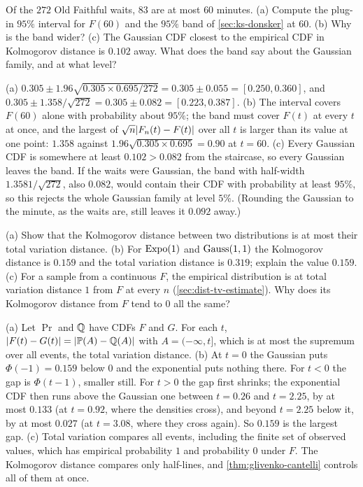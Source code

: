 \begin{exercise}
\label{ex:ks-band}
Of the $272$ Old Faithful waits, $83$ are at most $60$ minutes. (a) Compute the plug-in $95\%$ interval for $F(60)$ and the $95\%$ band of \cref{sec:ks-donsker} at $60$. (b) Why is the band wider? (c) The Gaussian CDF closest to the empirical CDF in Kolmogorov distance is $0.102$ away. What does the band say about the Gaussian family, and at what level?
\end{exercise}
\begin{solution}
(a) $0.305 \pm 1.96\sqrt{0.305 \times 0.695/272} = 0.305 \pm 0.055 = [0.250, 0.360]$, and $0.305 \pm 1.358/\sqrt{272} = 0.305 \pm 0.082 = [0.223, 0.387]$. (b) The interval covers $F(60)$ alone with probability about $95\%$; the band must cover $F(t)$ at every $t$ at once, and the largest of $\sqrt{n}\lvert F_n(t) - F(t)\rvert$ over all $t$ is larger than its value at one point: $1.358$ against $1.96\sqrt{0.305 \times 0.695} = 0.90$ at $t = 60$. (c) Every Gaussian CDF is somewhere at least $0.102 > 0.082$ from the staircase, so every Gaussian leaves the band. If the waits were Gaussian, the band with half-width $1.3581/\sqrt{272}$, also $0.082$, would contain their CDF with probability at least $95\%$, so this rejects the whole Gaussian family at level $5\%$. (Rounding the Gaussian to the minute, as the waits are, still leaves it $0.092$ away.)
\end{solution}

\begin{exercise}
\label{ex:ks-tv}
(a) Show that the Kolmogorov distance between two distributions is at most their total variation distance. (b) For $\text{Expo}(1)$ and $\text{Gauss}(1, 1)$ the Kolmogorov distance is $0.159$ and the total variation distance is $0.319$; explain the value $0.159$. (c) For a sample from a continuous $F$, the empirical distribution is at total variation distance $1$ from $F$ at every $n$ (\cref{sec:dist-tv-estimate}). Why does its Kolmogorov distance from $F$ tend to $0$ all the same?
\end{exercise}
\begin{solution}
(a) Let $\Pr$ and $\mathbb{Q}$ have CDFs $F$ and $G$. For each $t$, $\lvert F(t) - G(t)\rvert = \lvert\mathbb{P}(A) - \mathbb{Q}(A)\rvert$ with $A = (-\infty, t]$, which is at most the supremum over all events, the total variation distance. (b) At $t = 0$ the Gaussian puts $\Phi(-1) = 0.159$ below $0$ and the exponential puts nothing there. For $t < 0$ the gap is $\Phi(t - 1)$, smaller still. For $t > 0$ the gap first shrinks; the exponential CDF then runs above the Gaussian one between $t = 0.26$ and $t = 2.25$, by at most $0.133$ (at $t = 0.92$, where the densities cross), and beyond $t = 2.25$ below it, by at most $0.027$ (at $t = 3.08$, where they cross again). So $0.159$ is the largest gap. (c) Total variation compares all events, including the finite set of observed values, which has empirical probability $1$ and probability $0$ under $F$. The Kolmogorov distance compares only half-lines, and \cref{thm:glivenko-cantelli} controls all of them at once.
\end{solution}

